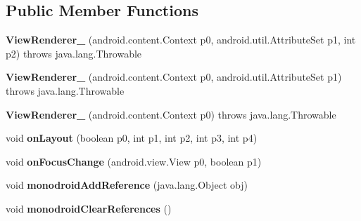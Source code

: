\subsection*{Public Member Functions}
\begin{DoxyCompactItemize}
\item 
\mbox{\label{classmd5b60ffeb829f638581ab2bb9b1a7f4f3f_1_1ViewRenderer__2_aa98f61b833d11b90b0f77280606f4d3a}} 
{\bfseries View\+Renderer\+\_} (android.\+content.\+Context p0, android.\+util.\+Attribute\+Set p1, int p2)  throws java.\+lang.\+Throwable 	
\item 
\mbox{\label{classmd5b60ffeb829f638581ab2bb9b1a7f4f3f_1_1ViewRenderer__2_ac966f9a1a233932f6db02bda0d1474f0}} 
{\bfseries View\+Renderer\+\_} (android.\+content.\+Context p0, android.\+util.\+Attribute\+Set p1)  throws java.\+lang.\+Throwable 	
\item 
\mbox{\label{classmd5b60ffeb829f638581ab2bb9b1a7f4f3f_1_1ViewRenderer__2_aafcf92f11bfe726fa3c914d9aa18b1a4}} 
{\bfseries View\+Renderer\+\_} (android.\+content.\+Context p0)  throws java.\+lang.\+Throwable 	
\item 
\mbox{\label{classmd5b60ffeb829f638581ab2bb9b1a7f4f3f_1_1ViewRenderer__2_a0b758be41e41d3577cadf82bc8d004b6}} 
void {\bfseries on\+Layout} (boolean p0, int p1, int p2, int p3, int p4)
\item 
\mbox{\label{classmd5b60ffeb829f638581ab2bb9b1a7f4f3f_1_1ViewRenderer__2_a44502ddde192de41caed438bc7428e96}} 
void {\bfseries on\+Focus\+Change} (android.\+view.\+View p0, boolean p1)
\item 
\mbox{\label{classmd5b60ffeb829f638581ab2bb9b1a7f4f3f_1_1ViewRenderer__2_a64ca8244a89f60a47c173d9c0b15d610}} 
void {\bfseries monodroid\+Add\+Reference} (java.\+lang.\+Object obj)
\item 
\mbox{\label{classmd5b60ffeb829f638581ab2bb9b1a7f4f3f_1_1ViewRenderer__2_adae20979ac761a65aa60c9b427509c37}} 
void {\bfseries monodroid\+Clear\+References} ()
\end{DoxyCompactItemize}
